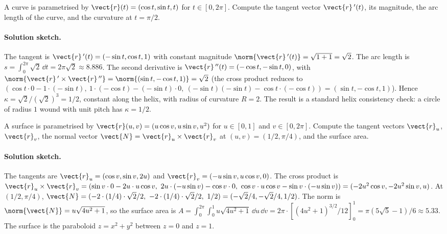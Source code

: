 \begin{exercise}
A curve is parametrised by $\vect{r}(t) = (\cos t, \sin t,
t)$ for $t \in [0, 2\pi]$. Compute the tangent vector
$\vect{r}\,'(t)$, its magnitude, the arc length of the curve, and
the curvature at $t = \pi/2$.

\paragraph{Solution sketch.} The tangent is $\vect{r}\,'(t) =
(-\sin t, \cos t, 1)$ with constant magnitude $\norm{\vect{r}\,'(t)}
= \sqrt{1 + 1} = \sqrt{2}$. The arc length is $s = \int_{0}^{2\pi}
\sqrt{2}\,\dd t = 2\pi\sqrt{2} \approx 8.886$. The second derivative
is $\vect{r}\,''(t) = (-\cos t, -\sin t, 0)$, with $\norm{\vect{r}\,'
\times\vect{r}\,''} = \norm{(\sin t, -\cos t, 1)} = \sqrt{2}$ (the
cross product reduces to $(\cos t \cdot 0 - 1\cdot(-\sin t),\
1\cdot(-\cos t) - (-\sin t)\cdot 0,\ (-\sin t)(-\sin t) - \cos t
\cdot(-\cos t)) = (\sin t, -\cos t, 1)$). Hence $\kappa = \sqrt{2}/
(\sqrt{2})^{3} = 1/2$, constant along the helix, with radius of
curvature $R = 2$. The result is a standard helix consistency check:
a circle of radius $1$ wound with unit pitch has $\kappa = 1/2$.
\end{exercise}

\begin{exercise}
A surface is parametrised by $\vect{r}(u, v) = (u\cos v, u\sin v,
u^{2})$ for $u \in [0, 1]$ and $v \in [0, 2\pi]$. Compute the
tangent vectors $\vect{r}_{u}$, $\vect{r}_{v}$, the normal vector
$\vect{N} = \vect{r}_{u} \times \vect{r}_{v}$ at $(u, v) = (1/2,
\pi/4)$, and the surface area.

\paragraph{Solution sketch.} The tangents are $\vect{r}_{u} =
(\cos v, \sin v, 2 u)$ and $\vect{r}_{v} = (-u\sin v, u\cos v, 0)$.
The cross product is $\vect{r}_{u}\times\vect{r}_{v} = (\sin v\cdot
0 - 2 u\cdot u\cos v,\ 2 u\cdot(-u\sin v) - \cos v\cdot 0,\
\cos v\cdot u\cos v - \sin v\cdot(-u\sin v)) = (-2 u^{2}\cos v,
-2 u^{2}\sin v, u)$. At $(1/2, \pi/4)$, $\vect{N} = (-2\cdot(1/4)
\cdot\sqrt{2}/2,\ -2\cdot(1/4)\cdot\sqrt{2}/2,\ 1/2) = (-\sqrt{2}/4,
-\sqrt{2}/4, 1/2)$. The norm is $\norm{\vect{N}} = u\sqrt{4 u^{2}
+ 1}$, so the surface area is $A = \int_{0}^{2\pi}\int_{0}^{1}
u\sqrt{4 u^{2} + 1}\,\dd u\,\dd v = 2\pi\cdot[(4 u^{2} + 1)^{3/2}
/12]_{0}^{1} = \pi(5\sqrt{5} - 1)/6 \approx 5.33$. The surface is
the paraboloid $z = x^{2} + y^{2}$ between $z = 0$ and $z = 1$.
\end{exercise}

